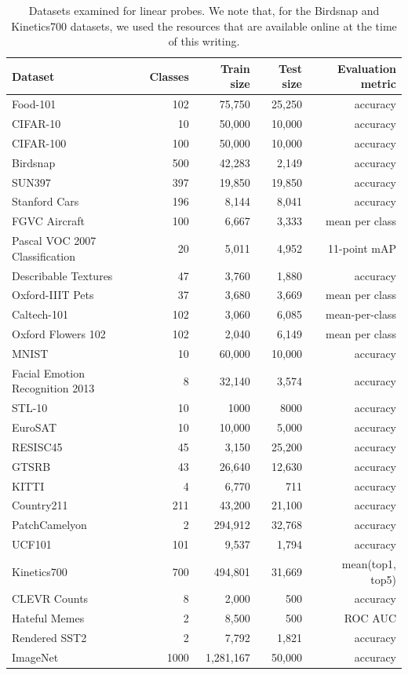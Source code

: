\documentclass{article}
\begin{document}
\begin{table}[t]
\centering
\begin{tabular}{lrrrr}
\toprule
    Dataset & Classes & Train size & Test size & Evaluation metric \\
\midrule
Food-101 & 102 & 75,750 & 25,250 & accuracy \\
CIFAR-10 & 10 & 50,000 & 10,000 & accuracy \\
CIFAR-100 & 100 & 50,000 & 10,000 & accuracy \\
Birdsnap & 500 & 42,283 & 2,149 & accuracy \\
SUN397 & 397 & 19,850 & 19,850 & accuracy \\
Stanford Cars & 196 & 8,144 & 8,041 & accuracy \\
FGVC Aircraft & 100 & 6,667 & 3,333 & mean per class \\
Pascal VOC 2007 Classification & 20 & 5,011 & 4,952 & 11-point mAP \\
Describable Textures & 47 & 3,760 & 1,880 & accuracy \\
Oxford-IIIT Pets & 37 & 3,680 & 3,669 & mean per class \\
Caltech-101 & 102 & 3,060 & 6,085 & mean-per-class \\
Oxford Flowers 102 & 102 & 2,040 & 6,149 & mean per class \\
\midrule
MNIST & 10 & 60,000 & 10,000 & accuracy \\
Facial Emotion Recognition 2013 & 8 & 32,140 & 3,574 & accuracy \\
STL-10 & 10 & 1000 & 8000 & accuracy \\
EuroSAT & 10 & 10,000 & 5,000 & accuracy \\
RESISC45 & 45 & 3,150 & 25,200 & accuracy \\
GTSRB & 43 & 26,640 & 12,630 & accuracy \\
KITTI & 4 & 6,770 & 711 & accuracy \\
Country211 & 211 & 43,200 & 21,100 & accuracy \\
PatchCamelyon & 2 & 294,912 & 32,768 & accuracy \\
UCF101 & 101 & 9,537 & 1,794 & accuracy \\
Kinetics700 & 700 & 494,801 & 31,669 & mean(top1, top5) \\
CLEVR Counts & 8 & 2,000 & 500 & accuracy \\
Hateful Memes & 2 & 8,500 & 500 & ROC AUC \\
Rendered SST2 & 2 & 7,792 & 1,821 & accuracy \\
ImageNet & 1000 & 1,281,167 & 50,000 & accuracy \\
\bottomrule
\end{tabular}
\caption{Datasets examined for linear probes. We note that, for the Birdsnap and Kinetics700 datasets, we used the resources that are available online at the time of this writing.}
\label{dataset_table}
\end{table}
\end{document}
